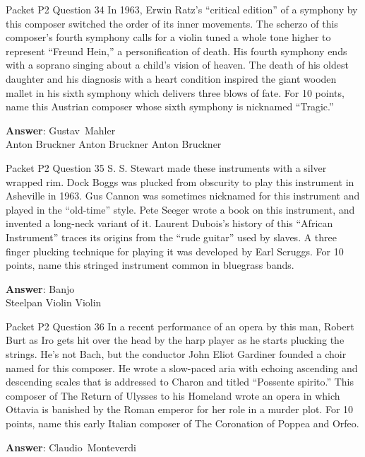 \begin{frame}{Packet P2 Question 34}
In 1963, Erwin Ratz’s “critical edition” of a symphony by this composer switched the order of its inner movements. The scherzo of this composer’s fourth symphony calls for a violin tuned a whole tone higher to represent “Freund Hein,” a personification of death. His fourth symphony ends with a soprano singing about a child’s vision of heaven. The death of his oldest daughter and his diagnosis with a heart condition inspired the giant wooden mallet in his sixth symphony which delivers   three blows of fate. For 10 points, name this Austrian composer whose sixth     symphony is nicknamed “Tragic.”  

\textbf{Answer}: Gustav\ Mahler\\
 Anton Bruckner
 Anton Bruckner
 Anton Bruckner
\end{frame}

\begin{frame}{Packet P2 Question 35}
S. S. Stewart made these instruments with   a silver wrapped rim. Dock Boggs was plucked from obscurity to play this instrument in Asheville in   1963. Gus Cannon was sometimes nicknamed for this instrument and played in the “old-time” style. Pete Seeger wrote a book   on this instrument, and invented a long-neck variant of it. Laurent Dubois’s history of this “African Instrument” traces its origins from the “rude guitar” used by slaves. A three finger plucking technique for playing it was developed by Earl Scruggs. For 10 points, name this stringed instrument common in bluegrass bands.    

\textbf{Answer}: Banjo\\
 Steelpan
 Violin
 Violin
\end{frame}

\begin{frame}{Packet P2 Question 36}
In a recent performance of an opera by this man, Robert Burt as Iro gets hit over the head by the harp player as he starts plucking the strings. He's not Bach, but the conductor John Eliot Gardiner founded a choir named for this composer. He wrote a slow-paced aria with echoing ascending and descending scales that is addressed to Charon and titled ``Possente spirito.'' This composer   of The Return of Ulysses to his Homeland   wrote an opera in which Ottavia is banished   by the Roman emperor for her role in a murder plot. For   10 points, name this early Italian composer of The Coronation of Poppea and Orfeo.

\textbf{Answer}: Claudio\ Monteverdi\\
\end{frame}

